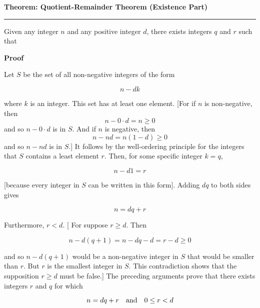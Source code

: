 \nopagenumbers
{\bf Theorem: Quotient-Remainder Theorem (Existence Part)}
\vskip 1mm
\hrule

\vskip 6pt
Given any integer $n$ and any positive integer $d$, there exists integers $q$ and $r$ such that 

\vskip 10pt
{\bf Proof }

\vskip 6pt
Let $S$ be the set of all non-negative integers of the form

$$n-dk$$

where $k$ is an integer. This set has at least one element. [For if $n$ is non-negative, then $$n-0\cdot d=n\geq 0$$ and so $n-0\cdot d$ is in $S$. And if $n$ is negative, then $$n-nd=n(1-d)\geq 0$$ and so $n-nd$ is in $S$.] It follows by the well-ordering principle for the integers that $S$ contains a least element $r$. Then, for some specific integer $k=q$,

$$n-d1=r$$

[because every integer in $S$ can be written in this form]. Adding $dq$ to both sides gives

$$n=dq+r$$

Furthermore, $r<d$. [ For suppose $r\geq d$. Then

$$n-d(q+1)=n-dq-d=r-d\geq 0$$

and so $n-d(q+1)$ would be a non-negative integer in $S$ that would be smaller than $r$. But $r$ is the smallest integer in $S$. This contradiction shows that the supposition $r\geq d$ must be false.] The preceding arguments prove that there exists integers $r$ and $q$ for which

$$n=dq+r \quad\hbox{and}\quad 0\leq r < d$$


\vfill\eject
